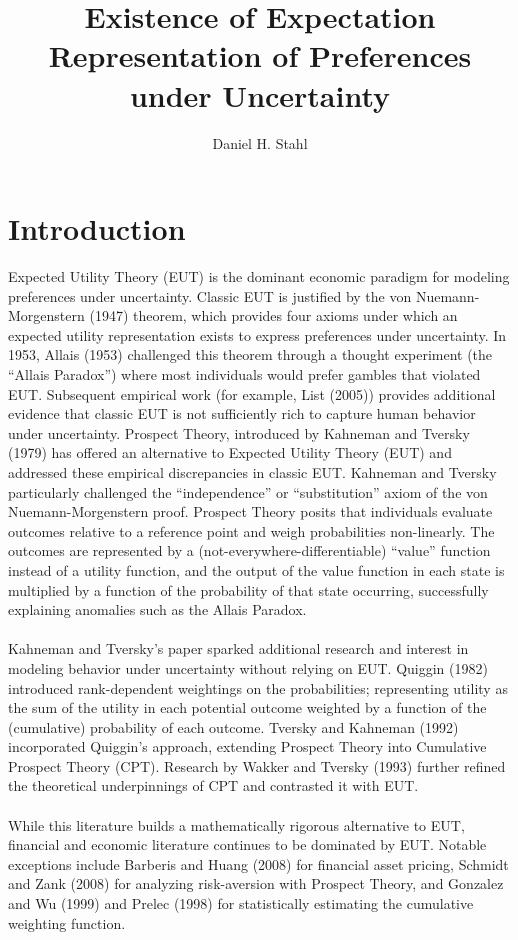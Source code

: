\documentclass{article}
\title{Existence of Expectation Representation of Preferences under Uncertainty}
\date{}
\author{Daniel H. Stahl}
\begin{document}
\maketitle
\section{Introduction}

Expected Utility Theory (EUT) is the dominant economic paradigm for modeling preferences under uncertainty. Classic EUT is justified by the von Nuemann-Morgenstern (1947) theorem, which provides four axioms under which an expected utility representation exists to express preferences under uncertainty.  In 1953, Allais (1953) challenged this theorem through a thought experiment (the ``Allais Paradox'') where most individuals would prefer gambles that violated EUT.  Subsequent empirical work (for example, List (2005)) provides additional evidence that classic EUT is not sufficiently rich to capture human behavior under uncertainty. Prospect Theory, introduced by Kahneman and Tversky (1979) has offered an alternative to Expected Utility Theory (EUT) and addressed these empirical discrepancies in classic EUT. Kahneman and Tversky particularly challenged the ``independence'' or ``substitution'' axiom of the von Nuemann-Morgenstern proof.  Prospect Theory posits that individuals evaluate outcomes relative to a reference point and weigh probabilities non-linearly. The outcomes are represented by a (not-everywhere-differentiable) ``value'' function instead of a utility function, and the output of the value function in each state is multiplied by a function of the probability of that state occurring, successfully explaining anomalies such as the Allais Paradox.
\\
\\
Kahneman and Tversky's paper sparked additional research and interest in modeling behavior under uncertainty without relying on EUT.  Quiggin (1982) introduced rank-dependent weightings on the probabilities; representing utility as the sum of the utility in each potential outcome weighted by a function of the (cumulative) probability of each outcome. Tversky and Kahneman (1992) incorporated Quiggin's approach, extending Prospect Theory into Cumulative Prospect Theory (CPT).  Research by Wakker and Tversky (1993) further refined the theoretical underpinnings of CPT and contrasted it with EUT.
\\
\\
While this literature builds a mathematically rigorous alternative to EUT, financial and economic literature continues to be dominated by EUT.  Notable exceptions include Barberis and Huang (2008) for financial asset pricing, Schmidt and Zank (2008) for analyzing risk-aversion with Prospect Theory, and Gonzalez and Wu (1999) and Prelec (1998) for statistically estimating the cumulative weighting function.
\end{document}
